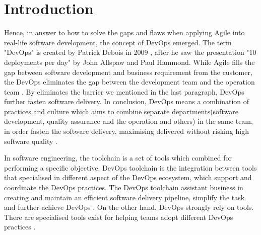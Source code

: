 \chapter{Introduction}
\label{chp:introduction}
\par
Hence, in answer to how to solve the gaps and flaws when applying Agile into real-life software development, the concept of DevOps emerged. The term "DevOps" is created by Patrick Debois in 2009 \cite{kim2016devops}, after he saw the presentation "10 deployments per day" by John Allspaw and Paul Hammond. While Agile fills the gap between software development and business requirement from the customer, the DevOps eliminates the gap between the development team and the operation team \cite{WhatisaD20:online}. By eliminates the barrier we mentioned in the last paragraph, DevOps further fasten software delivery. In conclusion, DevOps means a combination of practices and culture which aims to combine separate departments(software development, quality assurance and the operation and others) in the same team, in order fasten the software delivery, maximising delivered without risking high software quality \cite{DevOpsWi87:online}\cite{ebert2016devops}.
\par
In software engineering, the toolchain is a set of tools which combined for performing a specific objective. DevOps toolchain is the integration between tools that specialised in different aspect of the DevOps ecosystem, which support and coordinate the DevOps practices. The DevOps toolchain assistant business in creating and maintain an efficient software delivery pipeline, simplify the task and further achieve DevOps \cite{DevOpsto7:online}. On the other hand, DevOps strongly rely on tools. There are specialised tools exist for helping teams adopt different DevOps practices \cite{zhu2016devops}. 

